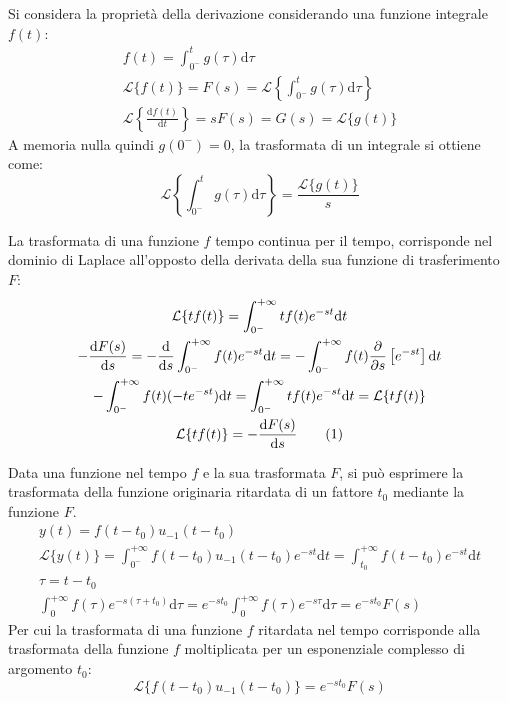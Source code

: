 \documentclass{article}
\newcommand{\df}{\mathrm{d}}
\newcommand{\tageq}{\tag{\stepcounter{equation}\theequation}}
\numberwithin{equation}{subsection}
\begin{document}
Si considera la proprietà della derivazione considerando una funzione integrale $f(t)$:
\begin{gather*}
    f(t)=\displaystyle\int_{0^-}^tg(\tau)\df\tau\\
    \mathcal{L}\{f(t)\}=F(s)=\mathcal{L}\left\{\displaystyle\int_{0^-}^tg(\tau)\df\tau\right\}\\
    \mathcal{L}\left\{\displaystyle\frac{\df f(t)}{\df t}\right\}=sF(s)=G(s)=\mathcal{L}\{g(t)\}
\end{gather*}
A memoria nulla quindi $g(0^-)=0$, la trasformata di un integrale si ottiene come:
\begin{equation}
    \mathcal{L}\left\{\displaystyle\int_{0^-}^tg(\tau)\df\tau\right\}=\frac{\mathcal{L}\{g(t)\}}{s}
\end{equation}



La trasformata di una funzione $f$ tempo continua per il tempo, corrisponde nel dominio di Laplace all'opposto della derivata della sua funzione di 
trasferimento $F$:
\begin{gather*}
    \mathcal{L}\{tf(t)\}=\displaystyle\int_{0^-}^{+\infty}tf(t)e^{-st}\df t\\
    \displaystyle-\frac{\df F(s)}{\df s}=-\frac{\df}{\df s}\int_{0^-}^{+\infty}f(t)e^{-st}\df t=-\int_{0^-}^{+\infty}f(t)\frac{\partial }{\partial s}\left[e^{-st}\right]\df t\\
    -\int_{0^-}^{+\infty}f(t)(-te^{-st})\df t=\int_{0^-}^{+\infty}tf(t)e^{-st}\df t=\mathcal{L}\{tf(t)\}\\
    \mathcal{L}\{tf(t)\}=\displaystyle-\frac{\df F(s)}{\df s}\tageq
\end{gather*}


Data una funzione nel tempo $f$ e la sua trasformata $F$, si può esprimere la trasformata della funzione originaria ritardata di un fattore $t_0$ mediante 
la funzione $F$. 
\begin{gather*}
    y(t)=f(t-t_0)u_{-1}(t-t_0)\\
    \mathcal{L}\{y(t)\}=\displaystyle\int_{0^-}^{+\infty}f(t-t_0)u_{-1}(t-t_0)e^{-st}\df t=\int_{t_0}^{+\infty}f(t-t_0)e^{-st}\df t\\
    \tau=t-t_0\\
    \displaystyle\int_{0}^{+\infty}f(\tau)e^{-s(\tau+t_0)}\df\tau=e^{-st_0}\int_0^{+\infty}f(\tau)e^{-s\tau}\df\tau=e^{-st_0}F(s)
\end{gather*}
Per cui la trasformata di una funzione $f$ ritardata nel tempo corrisponde alla trasformata della funzione $f$ moltiplicata per un esponenziale complesso di argomento $t_0$:
\begin{equation}
    \mathcal{L}\{f(t-t_0)u_{-1}(t-t_0)\}=e^{-st_0}F(s)
\end{equation}
\end{document}
